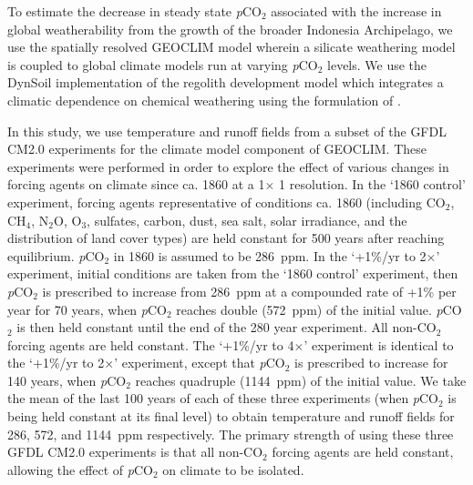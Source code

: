 \documentclass[11pt,letterpaper]{article}
\newcommand{\degrees}{\textdegree\xspace}
\newcommand{\pCOtwo}{\textit{p}CO$_{2}$\xspace}
\newcommand{\COtwo}{CO$_{2}$\xspace}
\begin{document}



To estimate the decrease in steady state \pCOtwo associated with the increase in global weatherability from the growth of the broader Indonesia Archipelago, we use the spatially resolved GEOCLIM model \citep{Godderis2014a, Godderis2017c} wherein a silicate weathering model is coupled to global climate models run at varying \pCOtwo levels. We use the DynSoil implementation of the \citet{Gabet2009a} regolith development model which integrates a climatic dependence on chemical weathering using the formulation of \cite{West2012a}.

In this study, we use temperature and runoff fields from a subset of the GFDL CM2.0 experiments \citep{Delworth2006a, Delworth2006b} for the climate model component of GEOCLIM. These experiments were performed in order to explore the effect of various changes in forcing agents on climate since ca. 1860 at a 1\degrees $\times$ 1\degrees resolution. In the `1860 control' experiment, forcing agents representative of conditions ca. 1860 (including \COtwo, CH$_{4}$, N$_{2}$O, O$_{3}$, sulfates, carbon, dust, sea salt, solar irradiance, and the distribution of land cover types) are held constant for 500 years after reaching equilibrium. \pCOtwo in 1860 is assumed to be 286~ppm. In the `+1\%/yr to 2$\times$' experiment, initial conditions are taken from the `1860 control' experiment, then \pCOtwo is prescribed to increase from 286~ppm at a compounded rate of +1\% per year for 70 years, when \pCOtwo reaches double (572~ppm) of the initial value. \pCOtwo is then held constant until the end of the 280 year experiment. All non-\COtwo forcing agents are held constant. The `+1\%/yr to 4$\times$' experiment is identical to the `+1\%/yr to 2$\times$' experiment, except that \pCOtwo is prescribed to increase for 140 years, when \pCOtwo reaches quadruple (1144~ppm) of the initial value. We take the mean of the last 100 years of each of these three experiments (when \pCOtwo is being held constant at its final level) to obtain temperature and runoff fields for 286, 572, and 1144~ppm respectively. The primary strength of using these three GFDL CM2.0 experiments is that all non-\COtwo forcing agents are held constant, allowing the effect of \pCOtwo on climate to be isolated.
\end{document}
